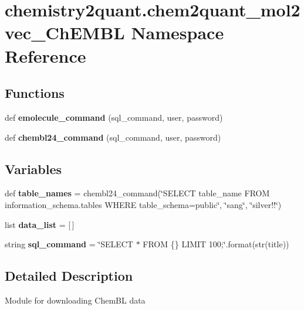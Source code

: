 \hypertarget{namespacechemistry2quant_1_1chem2quant__mol2vec__ChEMBL}{}\section{chemistry2quant.\+chem2quant\+\_\+mol2vec\+\_\+\+Ch\+E\+M\+BL Namespace Reference}
\label{namespacechemistry2quant_1_1chem2quant__mol2vec__ChEMBL}
\subsection*{Functions}
\begin{DoxyCompactItemize}
\item 
\mbox{\label{namespacechemistry2quant_1_1chem2quant__mol2vec__ChEMBL_add9e61c975d21bd982eefedd74eddef5}} 
def {\bfseries emolecule\+\_\+command} (sql\+\_\+command, user, password)
\item 
\mbox{\label{namespacechemistry2quant_1_1chem2quant__mol2vec__ChEMBL_a39a4a7753d552853870c7cc34f64629e}} 
def {\bfseries chembl24\+\_\+command} (sql\+\_\+command, user, password)
\end{DoxyCompactItemize}
\subsection*{Variables}
\begin{DoxyCompactItemize}
\item 
\mbox{\label{namespacechemistry2quant_1_1chem2quant__mol2vec__ChEMBL_ae760e712fcb5866e01a5bb2413d1caed}} 
def {\bfseries table\+\_\+names} = chembl24\+\_\+command(\char`\"{}S\+E\+L\+E\+CT table\+\_\+name F\+R\+OM information\+\_\+schema.\+tables W\+H\+E\+RE table\+\_\+schema=\textquotesingle{}public\textquotesingle{}\char`\"{}, \char`\"{}sang\char`\"{}, \char`\"{}silver!!\char`\"{})
\item 
\mbox{\label{namespacechemistry2quant_1_1chem2quant__mol2vec__ChEMBL_a9d78733df97662c23dcef1708f10272f}} 
list {\bfseries data\+\_\+list} = \mbox{[}$\,$\mbox{]}
\item 
\mbox{\label{namespacechemistry2quant_1_1chem2quant__mol2vec__ChEMBL_a1bc34f7a1563c700e2d1e074b8be7483}} 
string {\bfseries sql\+\_\+command} = \char`\"{}S\+E\+L\+E\+CT $\ast$ F\+R\+OM \{\} L\+I\+M\+IT 100;\char`\"{}.format(str(title))
\end{DoxyCompactItemize}


\subsection{Detailed Description}
\begin{DoxyVerb}Module for downloading ChemBL data \end{DoxyVerb}
 